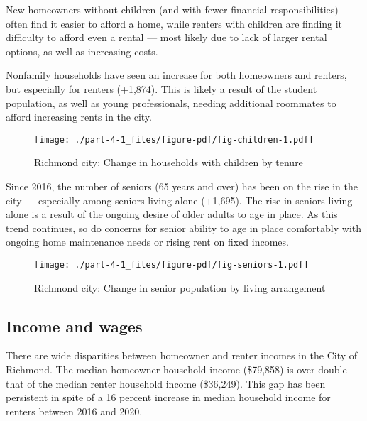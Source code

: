 \documentclass[
  letterpaper,
  DIV=11,
  numbers=noendperiod]{scrreprt}
\begin{document}
New homeowners without children (and with fewer financial
responsibilities) often find it easier to afford a home, while renters
with children are finding it difficulty to afford even a rental --- most
likely due to lack of larger rental options, as well as increasing
costs.

Nonfamily households have seen an increase for both homeowners and
renters, but especially for renters (+1,874). This is likely a result of
the student population, as well as young professionals, needing
additional roommates to afford increasing rents in the city.

\begin{figure}

{\centering \texttt{[image: ./part-4-1\_files/figure-pdf/fig-children-1.pdf]}

}

\caption{\label{fig-children}Richmond city: Change in households with
children by tenure}

\end{figure}

Since 2016, the number of seniors (65 years and over) has been on the
rise in the city --- especially among seniors living alone (+1,695). The
rise in seniors living alone is a result of the ongoing
\href{https://www.aarp.org/home-family/your-home/info-2021/home-and-community-preferences-survey.html}{desire
of older adults to age in place.} As this trend continues, so do
concerns for senior ability to age in place comfortably with ongoing
home maintenance needs or rising rent on fixed incomes.

\begin{figure}

{\centering \texttt{[image: ./part-4-1\_files/figure-pdf/fig-seniors-1.pdf]}

}

\caption{\label{fig-seniors}Richmond city: Change in senior population
by living arrangement}

\end{figure}

\hypertarget{income-and-wages}{%
\subsection{Income and wages}\label{income-and-wages}}

There are wide disparities between homeowner and renter incomes in the
City of Richmond. The median homeowner household income (\$79,858) is
over double that of the median renter household income (\$36,249). This
gap has been persistent in spite of a 16 percent increase in median
household income for renters between 2016 and 2020.
\end{document}
